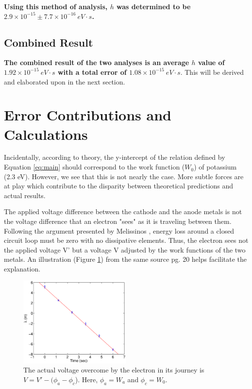 \documentclass[aps,twocolumn,secnumarabic,nobalancelastpage,amsmath,amssymb,
nofootinbib]{revtex4}
\begin{document}
\textbf{Using this method of analysis, $h$ was determined to be $2.9 \times 10^{-15} \pm 7.7 \times 10^{-16} ~eV \cdot s$.}


\subsection{Combined Result}

\textbf{The combined result of the two analyses is an average $h$ value of $1.92 \times 10^{-15} ~eV \cdot s$ with a total error of $1.08 \times 10^{-15} ~eV \cdot s$}.  This will be derived and elaborated upon in the next section.

\section{Error Contributions and Calculations}

Incidentally, according to theory, the y-intercept of the relation defined by Equation \ref{eq:main} should correspond to the work function ($W_0$) of potassium (2.3 eV).  However, we see that this is not nearly the case.  More subtle forces are at play which contribute to the disparity between theoretical predictions and actual results.  

The applied voltage difference between the cathode and the anode metals is not the voltage difference that an electron "sees" as it is traveling between them.  Following the argument presented by Melissinos \cite{melissinos}, energy loss around a closed circuit loop must be zero with no dissipative elements.  Thus, the electron sees not the applied voltage V' but a voltage V adjusted by the work functions of the two metals.  An illustration (Figure \ref{fig:melissinos}) from the same source \cite{melissinos} pg. 20 helps facilitate the explanation.  


\begin{figure}[htbp]
\includegraphics[width=2.2in]{melissinos}
\caption{\label{fig:melissinos} The actual voltage overcome by the electron in its journey is $V = V'-(\phi_a - \phi_c$).  Here, $\phi_a = W_a$ and $\phi_c = W_0$.}
\end{figure}
\end{document}
